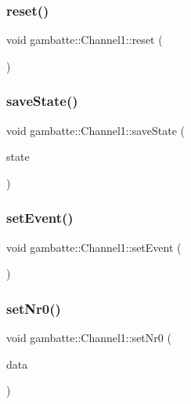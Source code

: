 \subsubsection{\texorpdfstring{reset()}{reset()}}
{\footnotesize\ttfamily void gambatte\+::\+Channel1\+::reset (\begin{DoxyParamCaption}{ }\end{DoxyParamCaption})}

\mbox{\label{classgambatte_1_1Channel1_ac7b4065f024987d29a090fd53771428d}} 
\subsubsection{\texorpdfstring{save\+State()}{saveState()}}
{\footnotesize\ttfamily void gambatte\+::\+Channel1\+::save\+State (\begin{DoxyParamCaption}\item[{\hyperlink{structgambatte_1_1SaveState}{Save\+State} \&}]{state }\end{DoxyParamCaption})}

\mbox{\label{classgambatte_1_1Channel1_a64fe824b3762fc41959765870518ae00}} 
\subsubsection{\texorpdfstring{set\+Event()}{setEvent()}}
{\footnotesize\ttfamily void gambatte\+::\+Channel1\+::set\+Event (\begin{DoxyParamCaption}{ }\end{DoxyParamCaption})\hspace{0.3cm}{\ttfamily [private]}}

\mbox{\label{classgambatte_1_1Channel1_a35804a47c4fdc016ee1b320a504ead57}} 
\subsubsection{\texorpdfstring{set\+Nr0()}{setNr0()}}
{\footnotesize\ttfamily void gambatte\+::\+Channel1\+::set\+Nr0 (\begin{DoxyParamCaption}\item[{unsigned}]{data }\end{DoxyParamCaption})}

